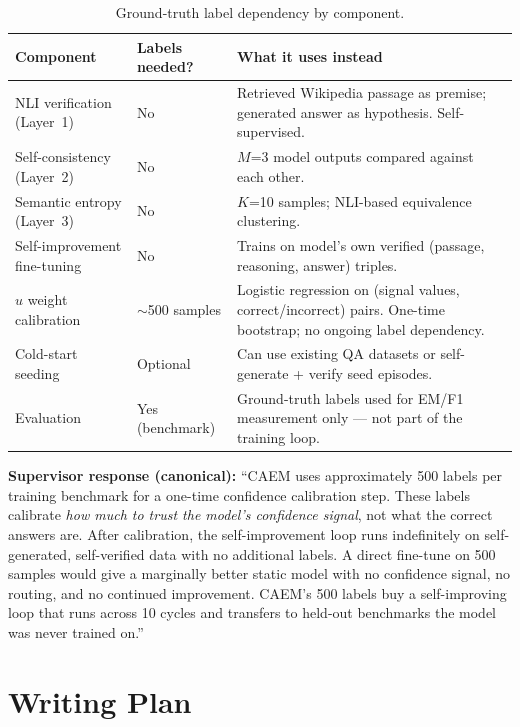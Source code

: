 \documentclass[12pt,a4paper]{article}
\newcommand{\caem}{CAEM}
\newcommand{\uhat}{\hat{u}}
\begin{document}
\begin{table}[htbp]
\centering
\caption{Ground-truth label dependency by component.}
\label{tab:labels}
\renewcommand{\arraystretch}{1.3}
\begin{tabular}{@{}p{4.5cm}p{2.2cm}p{6.0cm}@{}}
\toprule
\textbf{Component} & \textbf{Labels needed?} & \textbf{What it uses instead} \\
\midrule
NLI verification (Layer~1) & No &
  Retrieved Wikipedia passage as premise; generated answer as hypothesis.
  Self-supervised. \\
Self-consistency (Layer~2) & No &
  $M$=3 model outputs compared against each other. \\
Semantic entropy (Layer~3) & No &
  $K$=10 samples; NLI-based equivalence clustering. \\
Self-improvement fine-tuning & No &
  Trains on model's own verified (passage, reasoning, answer) triples. \\
$\uhat$ weight calibration & $\sim$500 samples &
  Logistic regression on (signal values, correct/incorrect) pairs.
  One-time bootstrap; no ongoing label dependency. \\
Cold-start seeding & Optional &
  Can use existing QA datasets or self-generate + verify seed episodes. \\
Evaluation & Yes (benchmark) &
  Ground-truth labels used for EM/F1 measurement only ---
  not part of the training loop. \\
\bottomrule
\end{tabular}
\end{table}

\textbf{Supervisor response (canonical):}
``\caem{} uses approximately 500 labels per training benchmark for a one-time
confidence calibration step.
These labels calibrate \emph{how much to trust the model's confidence signal},
not what the correct answers are.
After calibration, the self-improvement loop runs indefinitely on self-generated,
self-verified data with no additional labels.
A direct fine-tune on 500 samples would give a marginally better static model
with no confidence signal, no routing, and no continued improvement.
\caem{}'s 500 labels buy a self-improving loop that runs across 10 cycles and
transfers to held-out benchmarks the model was never trained on.''

\section{Writing Plan}
\label{sec:writing}
\end{document}
